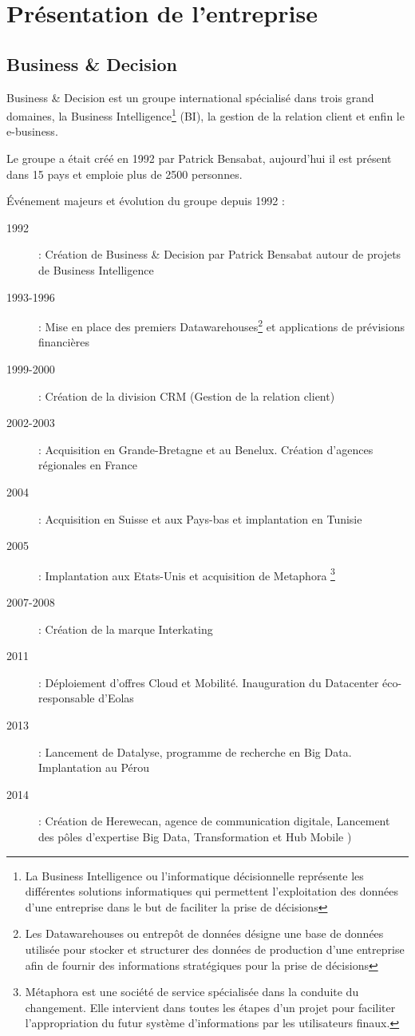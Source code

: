 \chapter{Présentation de l'entreprise}
\section{Business \& Decision}

        Business \& Decision est un groupe international spécialisé dans trois grand domaines, la Business Intelligence\footnote{La Business Intelligence ou l'informatique décisionnelle représente les différentes solutions informatiques qui permettent l'exploitation des données d'une entreprise dans le but de faciliter la prise de décisions} (BI), la gestion de la relation client et enfin le e-business. 

        Le groupe a était créé en 1992 par Patrick Bensabat, aujourd'hui il est présent dans 15 pays et emploie plus de 2500 personnes.

       	  Événement majeurs et évolution du groupe depuis 1992 : 

       	  \begin{description}
       	  \item[]
       	  \item[1992] : Création de Business \& Decision par Patrick Bensabat autour de projets de Business Intelligence
       	  \item[1993-1996] : Mise en place des premiers Datawarehouses\footnote{Les Datawarehouses ou entrepôt de données désigne une base de données utilisée pour stocker et structurer des données de production d'une entreprise afin de fournir des informations stratégiques pour la prise de décisions} et applications de prévisions financières
       	  \item[1999-2000] : Création de la division CRM (Gestion de la relation client)
       	  \item[2002-2003] : Acquisition en Grande-Bretagne et au Benelux. Création d'agences régionales en France
       	  \item[2004] : Acquisition en Suisse et aux Pays-bas et implantation en Tunisie
       	  \item[2005] : Implantation aux Etats-Unis et acquisition de Metaphora \footnote{Métaphora est une société de service spécialisée dans la conduite du changement. Elle intervient dans toutes les étapes d’un projet pour faciliter l'appropriation du futur système d’informations par les utilisateurs finaux.}
       	  \item[2007-2008] : Création de la marque Interkating
       	  \item[2011] : Déploiement d'offres Cloud et Mobilité. Inauguration du Datacenter éco-responsable d'Eolas
       	  \item[2013] : Lancement de Datalyse, programme de recherche en Big Data. Implantation au Pérou
       	  \item[2014] : Création de Herewecan, agence de communication digitale, Lancement des pôles d'expertise Big Data, Transformation et Hub Mobile )
       	  \item[]       	  
       	  \end{description}
       	  
